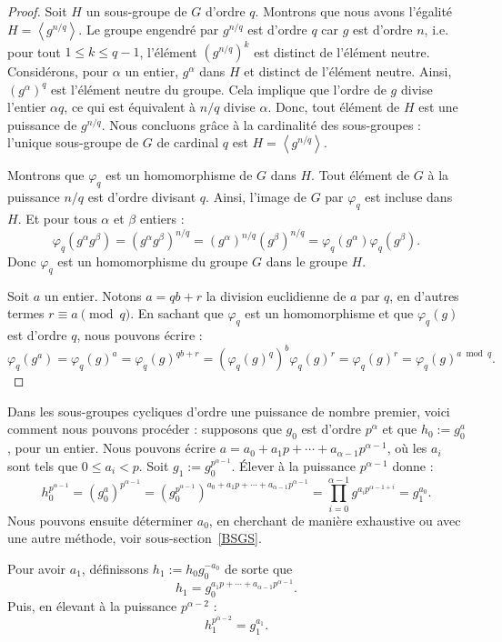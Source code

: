 \documentclass[a4paper, titlepage]{article}
\theoremstyle{definition}
\theoremstyle{remark}
\def\gen #1{\left\langle#1\right\rangle}
\begin{document}
\begin{proof}
Soit $H$ un sous-groupe de $G$ d'ordre $q$. Montrons que nous avons l'égalité $H = \gen{g^{n/q}}$. Le groupe engendré par $g^{n/q}$ est d'ordre $q$ car $g$ est d'ordre $n$, i.e. pour tout $1 \leqslant k \leqslant q-1$, l'élément $(g^{n/q})^k$ est distinct de l'élément neutre.
Considérons, pour $\alpha$ un entier, $g^\alpha$ dans $H$ et distinct de l'élément neutre. Ainsi, $(g^\alpha)^{q}$ est l'élément neutre du groupe. Cela implique que l'ordre de $g$ divise l'entier $\alpha q$, ce qui est équivalent à $n/q$ divise $\alpha$. Donc, tout élément de $H$ est une puissance de $g^{n/q}$. Nous concluons grâce à la cardinalité des sous-groupes : l'unique sous-groupe de $G$ de cardinal $q$ est $H = \gen{g^{n/q}}$.

Montrons que $\varphi_q$ est un homomorphisme de $G$ dans $H$. Tout élément de $G$ à la puissance $n/q$ est d'ordre divisant $q$. Ainsi, l'image de $G$ par $\varphi_q$ est incluse dans $H$. Et pour tous $\alpha$ et $\beta$ entiers :
$$\varphi_q(g^\alpha g^\beta ) = \left(g^\alpha g^\beta \right)^{n/q} = \left(g^\alpha \right)^{n/q}\left(g^\beta \right)^{n/q} = \varphi_q(g^\alpha )\varphi_q(g^\beta ).$$
Donc $\varphi_q$ est un homomorphisme du groupe $G$ dans le groupe $H$.

Soit $a$ un entier. Notons $a = qb + r$ la division euclidienne de $a$ par $q$, en d'autres termes $r \equiv a \pmod{q}$. En sachant que $\varphi_q$ est un homomorphisme et que $\varphi_q(g)$ est d'ordre $q$, nous pouvons écrire :
$$\varphi_q(g^a) = \varphi_q(g)^a = \varphi_q(g)^{qb + r} = \left({\varphi_q(g)^{q}}\right)^{b}\varphi_q(g)^{r} =\varphi_q(g)^{r} = \varphi_q(g)^{a \bmod{q}}.$$
\end{proof}

Dans les sous-groupes cycliques d'ordre une puissance de nombre premier, voici comment nous pouvons procéder : supposons que $g_0$ est d'ordre $p^\alpha$ et que $h_0 := g_0^a$, pour un entier. Nous pouvons écrire $a = a_0 + a_1 p + \cdots + a_{\alpha-1}p^{\alpha-1}$, où les $a_i$ sont tels que $0\leqslant a_i < p$. Soit $g_1 := g_0^{p^{\alpha-1}}$. \'Elever à la puissance $p^{\alpha-1}$ donne :
$$h_0^{p^{\alpha-1}} = {(g_0^a)}^{p^{\alpha-1}} = {\left(g_0^{p^{\alpha-1}}\right)}^{a_0 + a_1 p + \cdots + a_{\alpha-1}p^{\alpha-1}} = \prod_{i=0}^{\alpha -1 } g^{a_ip^{\alpha-1+i}} = g_1^{a_0}.$$
Nous pouvons ensuite déterminer $a_0$, en cherchant de manière exhaustive ou avec une autre méthode, voir sous-section~\ref{BSGS}.

Pour avoir $a_1$, définissons $h_1 := h_0g_0^{-a_0}$ de sorte que
$$h_1 = g_0^{a_1 p + \cdots + a_{\alpha-1}p^{\alpha-1}}.$$
Puis, en élevant à la puissance $p^{\alpha-2}$ :
$$h_1^{p^{\alpha-2}} = g_1^{a_1}.$$
\end{document}
